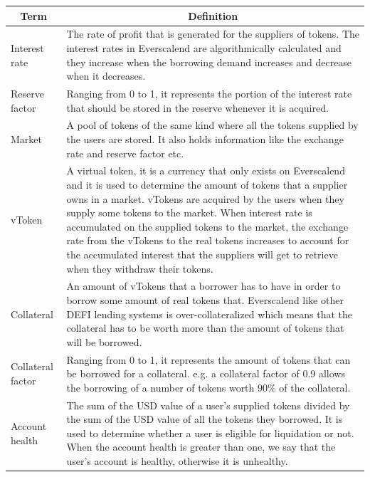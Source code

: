 \begin{tabularx}{\linewidth}{|l|X|}
  \hline
  \multicolumn{1}{|c|}{\textbf{Term}} & \multicolumn{1}{c|}{\textbf{Definition}} \\\hline
  \endhead

  Interest rate & The rate of profit that is generated for the suppliers of tokens. The interest rates in Everscalend are algorithmically calculated and they increase when the borrowing demand increases and decrease when it decreases. \\\hline

  Reserve factor & Ranging from 0 to 1, it represents the portion of the interest rate that should be stored in the reserve whenever it is acquired. \\\hline

  Market & A pool of tokens of the same kind where all the tokens supplied by the users are stored. It also holds information like the exchange rate and reserve factor etc. \\\hline

  vToken & A virtual token, it is a currency that only exists on Everscalend and it is used to determine the amount of tokens that a supplier owns in a market. vTokens are acquired by the users when they supply some tokens to the market. When interest rate is accumulated on the supplied tokens to the market, the exchange rate from the vTokens to the real tokens increases to account for the accumulated interest that the suppliers will get to retrieve when they withdraw their tokens. \\\hline

  Collateral & An amount of vTokens that a borrower has to have in order to borrow some amount of real tokens that. Everscalend like other DEFI lending systems is over-collateralized which means that the collateral has to be worth more than the amount of tokens that will be borrowed. \\\hline

  Collateral factor & Ranging from 0 to 1, it represents the amount of tokens that can be borrowed for a collateral. e.g. a collateral factor of 0.9 allows the borrowing of a number of tokens worth $90\%$ of the collateral. \\\hline

  Account health & The sum of the USD value of a user's supplied tokens divided by the sum of the USD value of all the tokens they borrowed. It is used to determine whether a user is eligible for liquidation or not. When the account health is greater than one, we say that the user's account is healthy, otherwise it is unhealthy. \\\hline


\end{tabularx}
